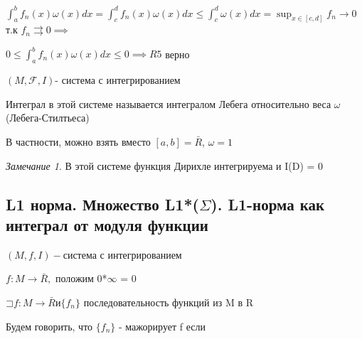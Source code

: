 \documentclass[a4paper]{article}
\newcommand\letsymbol{\mathord{\sqsupset}}
\theoremstyle{definition}
\theoremstyle{remark}
\newtheorem*{remark}{Замечание}
\begin{document}
$\int_a^b f_n(x)\omega (x)dx = \int_c^d f_n(x)\omega (x)dx \leq \int_c^d \omega(x)dx =\sup_{x\in [c,d]}f_n\to 0$ т.к $f_n\rightrightarrows 0\implies$

$0\leq \int_a^b f_n(x)\omega (x)dx\leq 0\implies R5 $ верно

$(M, \mathcal{F} , I)$- система с интегрированием

Интеграл в этой системе называется интегралом Лебега относительно веса $\omega$ (Лебега-Стилтьеса)

В частности, можно взять вместо $[a,b] = \bar{R}$, $\omega = 1$
\begin{remark}
     В этой системе функция Дирихле интегрируема и I(D) = 0
\end{remark}

    \subsection{ L1 норма. Множество L1*($\Sigma$). L1-норма как интеграл от модуля функции}
    $(M, f, I) - $система с интегрированием

$f:M\to\bar{R},$ положим 0*$\infty$ = 0

$\letsymbol{}f : M \to \bar{R} и \{f_n\}$ последовательность функций из M в R

Будем говорить, что $\{f_n\}$ - мажорирует f если 
\end{document}
